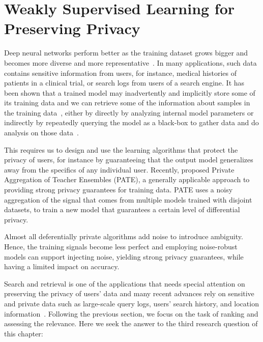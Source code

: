 \section{Weakly Supervised Learning for Preserving Privacy}
Deep neural networks perform better as the training dataset grows bigger and becomes more diverse and more representative~\citep{sun2017revisiting}.  In many applications, such data contains sensitive information from users, for instance, medical histories of patients in a clinical trial, or search logs from users of a search engine.  
It has been shown that a trained model may inadvertently
and implicitly store some of its training data and we can retrieve some of the information about samples in the training data~\citep{Shokri:2015}, either by directly by analyzing internal model parameters or indirectly by repeatedly querying the model as a black-box to gather data and do analysis on those data~\citep{Fredrikson:2015}. 

This requires us to design and use the learning algorithms that protect the privacy of users, for instance by guaranteeing that the output model generalizes away from the specifics of any
individual user. Recently, \citet{Papernot:2017} proposed Private Aggregation of Teacher Ensembles (PATE), a generally applicable approach to providing strong privacy guarantees for training data.  PATE uses a noisy aggregation of the signal that comes from multiple models trained with disjoint datasets, to train a new model that guarantees a certain level of differential privacy.

Almost all deferentially private algorithms add noise to introduce ambiguity. Hence, the training signals become less perfect and employing noise-robust models can support injecting noise, yielding strong privacy guarantees, while having a limited impact on accuracy.

Search and retrieval is one of the applications that needs special attention on preserving the privacy of users' data and many recent advances rely on sensitive and private data such as large-scale query logs, users’ search history, and location information~\citep{Yang:2017}. Following the previous section, we focus on the task of ranking and assessing the relevance.
Here we seek the answer to the third research question of this chapter:

